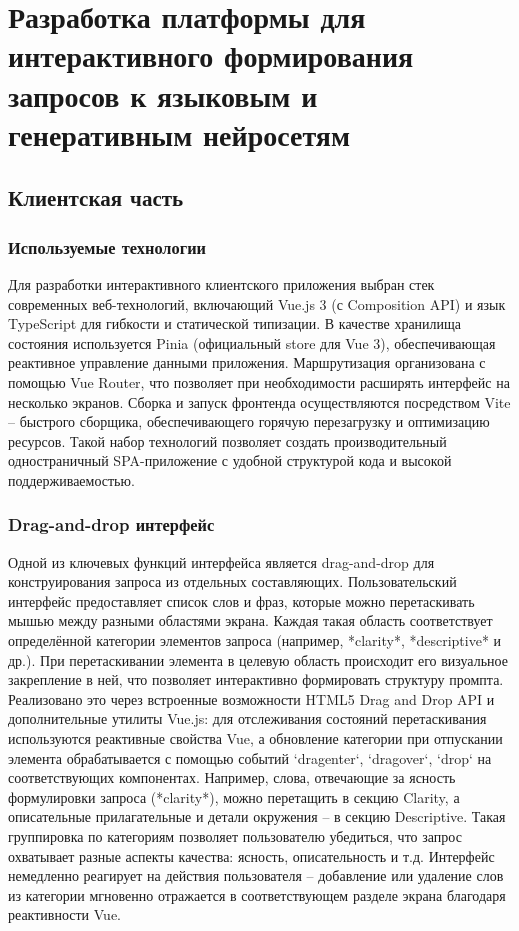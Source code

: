 \section{Разработка платформы для интерактивного формирования
запросов к языковым и генеративным нейросетям}
\label{sec:development}
\subsection{Клиентская часть}
\subsubsection{Используемые технологии}
 Для разработки интерактивного клиентского приложения выбран стек современных веб-технологий, включающий Vue.js 3 (с Composition API) и язык TypeScript для гибкости и статической типизации. В качестве хранилища состояния используется Pinia (официальный store для Vue 3), обеспечивающая реактивное управление данными приложения. Маршрутизация организована с помощью Vue Router, что позволяет при необходимости расширять интерфейс на несколько экранов. Сборка и запуск фронтенда осуществляются посредством Vite – быстрого сборщика, обеспечивающего горячую перезагрузку и оптимизацию ресурсов. Такой набор технологий позволяет создать производительный одностраничный SPA-приложение с удобной структурой кода и высокой поддерживаемостью.

\subsubsection{Drag-and-drop интерфейс}

Одной из ключевых функций интерфейса является drag-and-drop для конструирования запроса из отдельных составляющих. Пользовательский интерфейс предоставляет список слов и фраз, которые можно перетаскивать мышью между разными областями экрана. Каждая такая область соответствует определённой категории элементов запроса (например, *clarity*, *descriptive* и др.). При перетаскивании элемента в целевую область происходит его визуальное закрепление в ней, что позволяет интерактивно формировать структуру промпта. Реализовано это через встроенные возможности HTML5 Drag and Drop API и дополнительные утилиты Vue.js: для отслеживания состояний перетаскивания используются реактивные свойства Vue, а обновление категории при отпускании элемента обрабатывается с помощью событий `dragenter`, `dragover`, `drop` на соответствующих компонентах. Например, слова, отвечающие за ясность формулировки запроса (*clarity*), можно перетащить в секцию Clarity, а описательные прилагательные и детали окружения – в секцию Descriptive. Такая группировка по категориям позволяет пользователю убедиться, что запрос охватывает разные аспекты качества: ясность, описательность и т.д. Интерфейс немедленно реагирует на действия пользователя – добавление или удаление слов из категории мгновенно отражается в соответствующем разделе экрана благодаря реактивности Vue.


